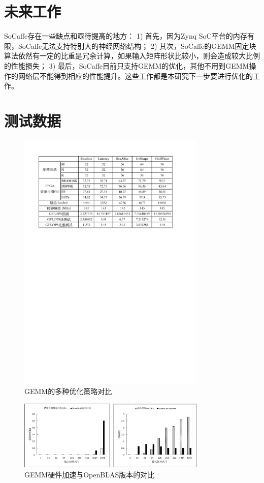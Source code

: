 \documentclass[a4paper, 12pt]{article}
\begin{document}
\section{未来工作}
SoCaffe存在一些缺点和亟待提高的地方：
1) 首先，因为Zynq SoC平台的内存有限，SoCaffe无法支持特别大的神经网络结构；
2) 其次，SoCaffe的GEMM固定块算法依然有一定的比重是冗余计算，如果输入矩阵形状比较小，则会造成较大比例的性能损失；
3) 最后，SoCaffe目前只支持GEMM的优化，其他不用到GEMM操作的网络层不能得到相应的性能提升。这些工作都是本研究下一步要进行优化的工作。

\section{测试数据}

\begin{figure}[!ht]
	\centering
	\includegraphics[width=0.8\textwidth]{assets/imgs/gemmcomp}
	\caption{GEMM的多种优化策略对比}
\end{figure}
\begin{figure}[!ht]
	\centering
	\includegraphics[width=0.8\textwidth]{assets/imgs/gemmblas}
	\caption{GEMM硬件加速与OpenBLAS版本的对比}
\end{figure}
\end{document}
